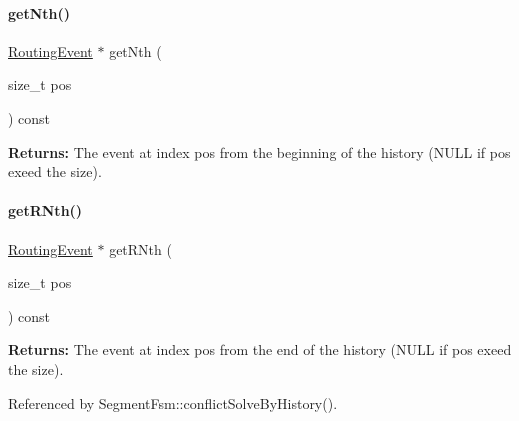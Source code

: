 \mbox{\label{classKite_1_1RoutingEventHistory_a81fbd6a845cb991db9f03f13edb14a50}} 
\paragraph{\texorpdfstring{get\+Nth()}{getNth()}}
{\footnotesize\ttfamily \mbox{\hyperlink{classKite_1_1RoutingEvent}{Routing\+Event}} $\ast$ get\+Nth (\begin{DoxyParamCaption}\item[{size\+\_\+t}]{pos }\end{DoxyParamCaption}) const}

{\bfseries Returns\+:} The event at index {\ttfamily pos} from the beginning of the history ({\ttfamily N\+U\+LL} if {\ttfamily pos} exeed the size). \mbox{\label{classKite_1_1RoutingEventHistory_abf422c3119f0b121ce124aff979eafff}} 
\paragraph{\texorpdfstring{get\+R\+Nth()}{getRNth()}}
{\footnotesize\ttfamily \mbox{\hyperlink{classKite_1_1RoutingEvent}{Routing\+Event}} $\ast$ get\+R\+Nth (\begin{DoxyParamCaption}\item[{size\+\_\+t}]{pos }\end{DoxyParamCaption}) const}

{\bfseries Returns\+:} The event at index {\ttfamily pos} from the end of the history ({\ttfamily N\+U\+LL} if {\ttfamily pos} exeed the size). 

Referenced by Segment\+Fsm\+::conflict\+Solve\+By\+History().

\mbox{\label{classKite_1_1RoutingEventHistory_ac802427673567526d06af911e94f7216}} 
